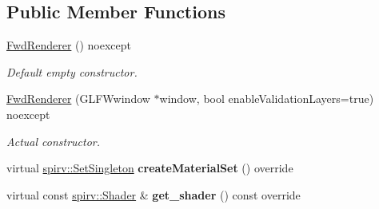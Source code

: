 \subsection*{Public Member Functions}
\begin{DoxyCompactItemize}
\item 
\mbox{\label{classblaze_1_1FwdRenderer_a9144b4500d80c3cc784506f9930f9fbc}} 
\hyperlink{classblaze_1_1FwdRenderer_a9144b4500d80c3cc784506f9930f9fbc}{Fwd\+Renderer} () noexcept
\begin{DoxyCompactList}\small\item\em Default empty constructor. \end{DoxyCompactList}\item 
\hyperlink{classblaze_1_1FwdRenderer_a4930aa617bc159adf645bce6ff5866a5}{Fwd\+Renderer} (G\+L\+F\+Wwindow $\ast$window, bool enable\+Validation\+Layers=true) noexcept
\begin{DoxyCompactList}\small\item\em Actual constructor. \end{DoxyCompactList}\item 
\mbox{\label{classblaze_1_1FwdRenderer_a322489ddcd20fa21a14cae91b37caf5f}} 
virtual \hyperlink{structblaze_1_1spirv_1_1SetSingleton}{spirv\+::\+Set\+Singleton} {\bfseries create\+Material\+Set} () override
\item 
\mbox{\label{classblaze_1_1FwdRenderer_afdfe27f7255e4b8f8ed1333e0180fa03}} 
virtual const \hyperlink{structblaze_1_1spirv_1_1Shader}{spirv\+::\+Shader} \& {\bfseries get\+\_\+shader} () const override
\end{DoxyCompactItemize}
